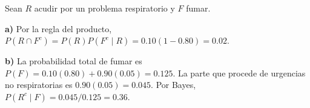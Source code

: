 Sean $R$ acudir por un problema respiratorio y $F$ fumar.

\textbf{a)} Por la regla del producto,
$P(R\cap F^c)=P(R)P(F^c\mid R)=0.10(1-0.80)=\boxed{0.02}$.

\textbf{b)} La probabilidad total de fumar es
$P(F)=0.10(0.80)+0.90(0.05)=0.125$. La parte que procede
de urgencias no respiratorias es $0.90(0.05)=0.045$.
Por Bayes, $P(R^c\mid F)=0.045/0.125=\boxed{0.36}$.
